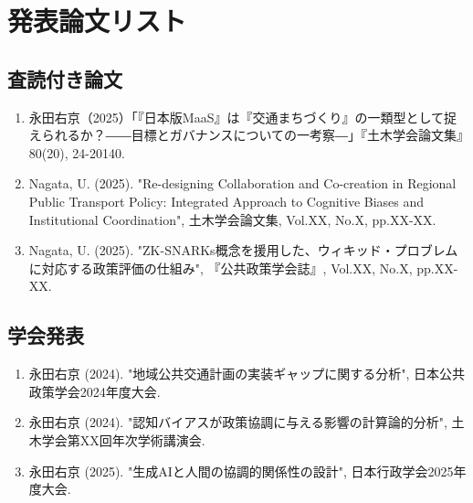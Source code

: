 
\chapter*{発表論文リスト}

\section*{査読付き論文}

\begin{enumerate}
    \item 永田右京（2025）「『日本版MaaS』は『交通まちづくり』の一類型として捉えられるか？――目標とガバナンスについての一考察―」『土木学会論文集』80(20), 24-20140.
    
    \item Nagata, U. (2025). "Re-designing Collaboration and Co-creation in Regional Public Transport Policy: Integrated Approach to Cognitive Biases and Institutional Coordination", 土木学会論文集, Vol.XX, No.X, pp.XX-XX.
    
    \item Nagata, U. (2025). "ZK-SNARKs概念を援用した、ウィキッド・プロブレムに対応する政策評価の仕組み", 『公共政策学会誌』, Vol.XX, No.X, pp.XX-XX.
\end{enumerate}

\section*{学会発表}

\begin{enumerate}
    \item 永田右京 (2024). "地域公共交通計画の実装ギャップに関する分析", 日本公共政策学会2024年度大会.
    
    \item 永田右京 (2024). "認知バイアスが政策協調に与える影響の計算論的分析", 土木学会第XX回年次学術講演会.
    
    \item 永田右京 (2025). "生成AIと人間の協調的関係性の設計", 日本行政学会2025年度大会.
\end{enumerate}

